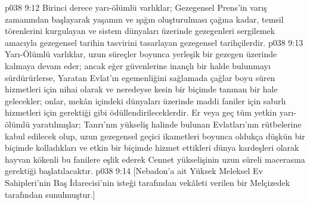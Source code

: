 \vs p038 9:12 Birinci derece yarı\hyp{}ölümlü varlıklar; Gezegensel Prens’in varış zamanından başlayarak yaşamın ve ışığın oluşturulması çağına kadar, temsil törenlerini kurgulayan ve sistem dünyaları üzerinde gezegenleri sergilemek amacıyla gezegensel tarihin tasvirini tasarlayan gezegensel tarihçilerdir.
\vs p038 9:13 Yarı\hyp{}Ölümlü varlıklar, uzun süreçler boyunca yerleşik bir gezegen üzerinde kalmaya devam eder; ancak eğer güvenlerine inançlı bir halde bulunmayı sürdürürlerse, Yaratan Evlat’ın egemenliğini sağlamada çağlar boyu süren hizmetleri için nihai olarak ve neredeyse kesin bir biçimde tanınan bir hale gelecekler; onlar, mekân içindeki dünyaları üzerinde maddi faniler için sabırlı hizmetleri için gerektiği gibi ödüllendirileceklerdir. Er veya geç tüm yetkin yarı\hyp{}ölümlü yaratılmışlar; Tanrı’nın yükseliş halinde bulunan Evlatları’nın rütbelerine kabul edilecek olup, uzun gezegensel geçici ikametleri boyunca oldukça düşkün bir biçimde kolladıkları ve etkin bir biçimde hizmet ettikleri dünya kardeşleri olarak hayvan kökenli bu fanilere eşlik ederek Cennet yükselişinin uzun süreli macerasına gerektiği başlatılacaktır.
\vs p038 9:14 [Nebadon’a ait Yüksek Meleksel Ev Sahipleri’nin Baş İdarecisi’nin isteği tarafından vekâleti verilen bir Melçizedek tarafından sunulmuştur.]
